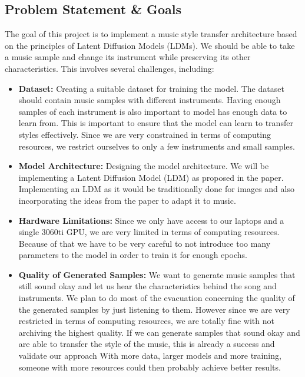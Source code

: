 \subsection{Problem Statement \& Goals}
The goal of this project is to implement a music style transfer architecture based on the principles of Latent Diffusion Models (LDMs).
We should be able to take a music sample and change its instrument while preserving its other characteristics.
This involves several challenges, including:

\begin{itemize}
    \item \textbf{Dataset:} Creating a suitable dataset for training the model. 
      The dataset should contain music samples with different instruments. Having enough samples of each instrument is also important to 
      model has enough data to learn from. This is important to ensure that the model can learn to transfer styles effectively. 
      Since we are very constrained in terms of computing resources, we restrict ourselves to only a few instruments and small samples.

    \item \textbf{Model Architecture:} Designing the model architecture. 
      We will be implementing a Latent Diffusion Model (LDM) as proposed in the paper.
      Implementing an LDM as it would be traditionally done for images and also incorporating the ideas from the paper to adapt it to music.

    \item \textbf{Hardware Limitations:}
      Since we only have access to our laptops and a single 3060ti GPU, we are very limited in terms of computing resources.
      Because of that we have to be very careful to not introduce too many parameters to the model in order to train it for enough epochs.
      
    \item \textbf{Quality of Generated Samples:}
      We want to generate music samples that still sound okay and let us hear the characteristics behind the song and instruments.
      We plan to do most of the evacuation concerning the quality of the generated samples by just listening to them.
      However since we are very restricted in terms of computing resources, we are totally fine with not archiving the highest quality.
      If we can generate samples that sound okay and are able to transfer the style of the music, this is already a success and validate our approach
      With more data, larger models and more training, someone with more resources could then probably achieve better results.
\end{itemize}